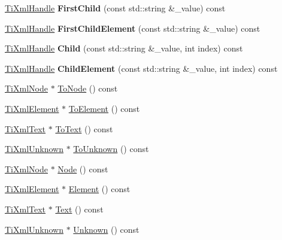 \begin{DoxyCompactItemize}
\hyperlink{class_ti_xml_handle}{Ti\+Xml\+Handle} {\bfseries First\+Child} (const std\+::string \&\+\_\+value) const
\item 
\mbox{\label{class_ti_xml_handle_ad048deff008dbb4b6887e9ac0d91f7df}} 
\hyperlink{class_ti_xml_handle}{Ti\+Xml\+Handle} {\bfseries First\+Child\+Element} (const std\+::string \&\+\_\+value) const
\item 
\mbox{\label{class_ti_xml_handle_abc163863954f3e3cf38d08c0773ce066}} 
\hyperlink{class_ti_xml_handle}{Ti\+Xml\+Handle} {\bfseries Child} (const std\+::string \&\+\_\+value, int index) const
\item 
\mbox{\label{class_ti_xml_handle_afac0eed86787294829cca36c44626be2}} 
\hyperlink{class_ti_xml_handle}{Ti\+Xml\+Handle} {\bfseries Child\+Element} (const std\+::string \&\+\_\+value, int index) const
\item 
\hyperlink{class_ti_xml_node}{Ti\+Xml\+Node} $\ast$ \hyperlink{class_ti_xml_handle_a0e436dea2dd869a859e3a4486023f0fa}{To\+Node} () const
\item 
\hyperlink{class_ti_xml_element}{Ti\+Xml\+Element} $\ast$ \hyperlink{class_ti_xml_handle_a0e3a5333550237d899b1df2b965611a1}{To\+Element} () const
\item 
\hyperlink{class_ti_xml_text}{Ti\+Xml\+Text} $\ast$ \hyperlink{class_ti_xml_handle_abde286bce1d5db0d20ec30e573278cdf}{To\+Text} () const
\item 
\hyperlink{class_ti_xml_unknown}{Ti\+Xml\+Unknown} $\ast$ \hyperlink{class_ti_xml_handle_a450ec91dac1ded02d72eb918d062ad31}{To\+Unknown} () const
\item 
\hyperlink{class_ti_xml_node}{Ti\+Xml\+Node} $\ast$ \hyperlink{class_ti_xml_handle_aec0e3ea58ff98a45cd13507a02e2ca1e}{Node} () const
\item 
\hyperlink{class_ti_xml_element}{Ti\+Xml\+Element} $\ast$ \hyperlink{class_ti_xml_handle_ae9b22d71bf5f69ee5fda28f5ad21f19c}{Element} () const
\item 
\hyperlink{class_ti_xml_text}{Ti\+Xml\+Text} $\ast$ \hyperlink{class_ti_xml_handle_ad3b502c72059421e4dfcc7bda3c392fe}{Text} () const
\item 
\hyperlink{class_ti_xml_unknown}{Ti\+Xml\+Unknown} $\ast$ \hyperlink{class_ti_xml_handle_a12b32f098c7daa5facbc04e9618262c5}{Unknown} () const
\end{DoxyCompactItemize}


